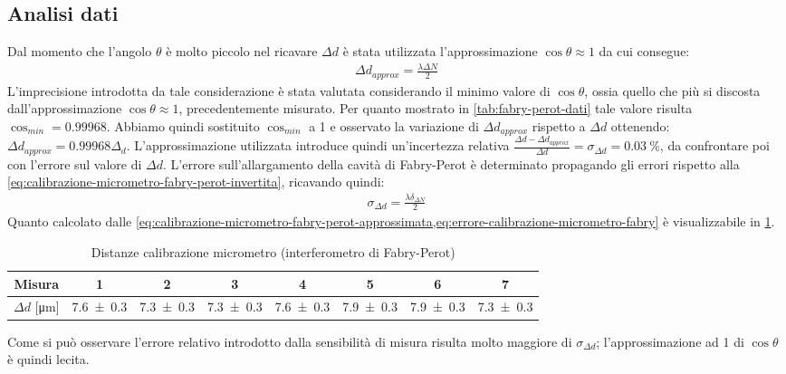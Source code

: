 \documentclass[a4paper]{article}
\begin{document}
\subsection{Analisi dati}
Dal momento che l'angolo $\theta$ è molto piccolo nel ricavare $\Delta d$ è stata utilizzata l'approssimazione $\cos{\theta}\approx1$ da cui consegue:
\begin{align}
    \Delta d_{approx} = \frac{\lambda \Delta N}{2}
\label{eq:calibrazione-micrometro-fabry-perot-approssimata}
\end{align}
L'imprecisione introdotta da tale considerazione è stata valutata considerando il minimo valore di $\cos{\theta}$, ossia quello che più si discosta dall'approssimazione $\cos{\theta}\approx1$, precedentemente misurato. Per quanto mostrato in \cref{tab:fabry-perot-dati} tale valore risulta $\cos_{min}=\num{0.99968}$.
Abbiamo quindi sostituito $\cos_{min}$ a 1 e osservato la variazione di $\Delta d_{approx}$ rispetto a $\Delta d$ ottenendo: $\Delta d_{approx} = \num{0.99968}\Delta_d$. L'approssimazione utilizzata introduce quindi un'incertezza relativa $\frac{\Delta d- \Delta d_{approx}}{\Delta d}=\sigma_{\Delta d}=\SI{0.03}{\percent}$, da confrontare poi con l'errore sul valore di $\Delta d$.
L'errore sull'allargamento della cavità di Fabry-Perot è determinato propagando gli errori rispetto alla \cref{eq:calibrazione-micrometro-fabry-perot-invertita}, ricavando quindi:
\begin{align}
   \sigma_{\Delta d}= \frac{\lambda \delta_{\Delta N}}{2}
\label{eq:errore-calibrazione-micrometro-fabry}
\end{align}
Quanto calcolato dalle \cref{eq:calibrazione-micrometro-fabry-perot-approssimata,eq:errore-calibrazione-micrometro-fabry} è visualizzabile in \cref{tab:distanze-calibrazione-fabry-perot}.
\begin{table}[htbp]
\centering
\caption{Distanze calibrazione micrometro (interferometro di Fabry-Perot)}
\begin{tabular}{cccccccc}
\toprule
Misura & 1 & 2 & 3 & 4 & 5 & 6 & 7 \\
\midrule
$\Delta d$ [\si{\micro\meter}] & \num{7.6 \pm 0.3}  & \num{7.3 \pm 0.3}  & \num{7.3 \pm 0.3}  & \num{7.6 \pm 0.3}  & \num{7.9 \pm 0.3} & \num{7.9 \pm 0.3} & \num{7.3 \pm 0.3} \\
\bottomrule
\end{tabular}
\label{tab:distanze-calibrazione-fabry-perot}
\end{table}
Come si può osservare l'errore relativo introdotto dalla sensibilità di misura risulta molto maggiore di $\sigma_{\Delta d}$; l'approssimazione ad 1 di $\cos{\theta}$ è quindi lecita.
\end{document}
